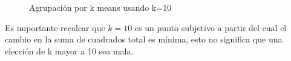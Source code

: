 \documentclass[12pt,spanish]{article}
\begin{document}
	\begin{figure}[H]%
		\centering
		\qquad
		\caption{Agrupación por k means usando k=10}%
		\label{fig:example}%
	\end{figure}
	Es importante recalcar que $k=10$ es un punto subjetivo a partir del cual el cambio en la suma de cuadrados total es mínima, esto no significa que una elección de k mayor a 10 sea mala.
\end{document}
